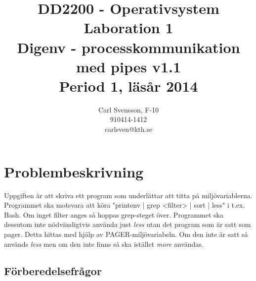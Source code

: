 \documentclass[10pt,a4paper]{article}
\title{DD2200 - Operativsystem \\ Laboration 1 \\ Digenv - processkommunikation med pipes  v1.1 \\ Period 1, läsår 2014}
\author{Carl Svensson, F-10 \\ 910414-1412 \\ carlsven@kth.se}
\date{}
\begin{document}
\maketitle
\tableofcontents
\clearpage


\section{Problembeskrivning}

Uppgiften är att skriva ett program som underlättar att titta på miljövariablerna. Programmet ska motsvara att köra "printenv | grep <filter> | sort | less" i t.ex. Bash. Om inget filter anges så hoppas grep-steget över.
Programmet ska dessutom inte nödvändigtvis använda just \emph{less} utan det program som är satt som pager. Detta hittas med hjälp av PAGER-miljövariabeln. Om den inte är satt så används \emph{less} men om den inte finns så ska istället \emph{more} användas.

\subsection{Förberedelsefrågor}
\end{document}
